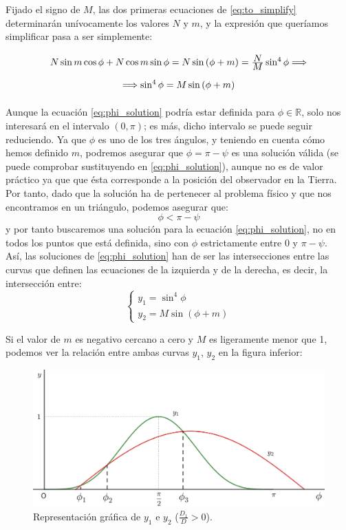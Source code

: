 Fijado el signo de $M$, las dos primeras ecuaciones de \eqref{eq:to_simplify} determinarán unívocamente los valores $N$ y $m$, y la expresión que queríamos simplificar pasa a ser simplemente:
\begin{align}
\def\arraystretch{2}
\begin{array}{c}
	N\sin{m}\cos{\phi}+N\cos{m}\sin{\phi}=N\sin{(\phi+m)}=\ddfrac{N}{M}\sin^4{\phi} \Longrightarrow\\
	\Longrightarrow\sin^4{\phi}=M\sin{(\phi+m)}
\end{array}
\label{eq:phi_solution}
\end{align}

Aunque la ecuación \eqref{eq:phi_solution} podría estar definida para $\phi\in\mathbb{R}$, solo nos interesará en el intervalo $(0,\pi)$; es más, dicho intervalo se puede seguir reduciendo. Ya que $\phi$ es uno de los tres ángulos, y teniendo en cuenta cómo hemos definido $m$, podremos asegurar que $\phi=\pi-\psi$ es una solución válida (se puede comprobar sustituyendo en \eqref{eq:phi_solution}), aunque no es de valor práctico ya que que ésta corresponde a la posición del observador en la Tierra. Por tanto, dado que la solución ha de pertenecer al problema físico y que nos encontramos en un triángulo, podemos asegurar que:
\[
\phi<\pi-\psi
\]
\noindent y por tanto buscaremos una solución para la ecuación \eqref{eq:phi_solution}, no en todos los puntos que está definida, sino con $\phi$ estrictamente entre 0 y $\pi-\psi$.\\

Así, las soluciones de \eqref{eq:phi_solution} han de ser las intersecciones entre las curvas que definen las ecuaciones de la izquierda y de la derecha, es decir, la intersección entre:
\[
\left\{
\begin{array}{l}
	y_1=\sin^4{\phi}\\
	y_2=M\sin{(\phi+m)}
\end{array}
\right.
\]

Si el valor de $m$ es negativo cercano a cero y $M$ es ligeramente menor que 1, podemos ver la relación entre ambas curvas $y_1$, $y_2$ en la figura inferior:

\begin{figure}[H]
\centering
\includegraphics[scale=0.125]{images/phi_solution_m_negative_M_near_1.png}
\caption{Representación gráfica de $y_1$ e $y_2$ ($\frac{D_1}{D}>0$).}
\label{fig:phi_solution_m_negative_M_near_1}
\end{figure}

